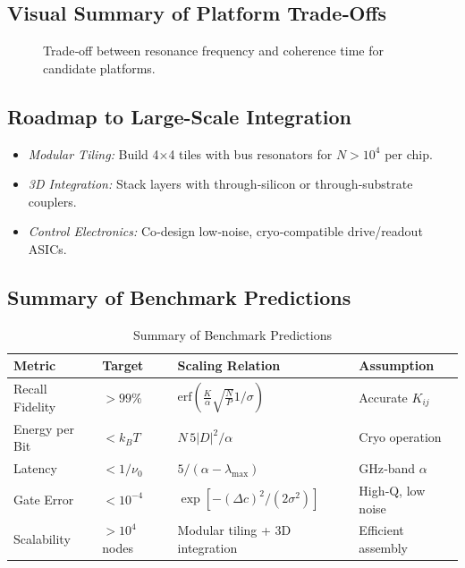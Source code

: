 \subsection{Visual Summary of Platform Trade‐Offs}
\begin{figure}[ht]
  \centering
  \caption{Trade‐off between resonance frequency and coherence time for candidate platforms.}
  \label{fig:platform_tradeoff}
\end{figure}

\subsection{Roadmap to Large-Scale Integration}
\begin{itemize}
  \item \emph{Modular Tiling:} Build 4×4 tiles with bus resonators for $N>10^4$ per chip.
  \item \emph{3D Integration:} Stack layers with through‐silicon or through‐substrate couplers.
  \item \emph{Control Electronics:} Co‐design low‐noise, cryo‐compatible drive/readout ASICs.
\end{itemize}

\subsection{Summary of Benchmark Predictions}
\begin{table}[ht]
  \centering
  \caption{Summary of Benchmark Predictions}
  \begin{tabular}{@{}llll@{}}
    \toprule
    Metric               & Target        & Scaling Relation                   & Assumption \\
    \midrule
    Recall Fidelity      & $>99\%$       & $\mathrm{erf}(\frac{K}{\alpha}\sqrt{\frac{N}{P}}1/\sigma)$ & Accurate $K_{ij}$ \\
    Energy per Bit       & $<k_BT$       & $N\,5|D|^2/\alpha$                 & Cryo operation \\
    Latency              & $<1/\nu_0$    & $5/(\alpha - \lambda_{\max})$      & GHz‐band $\alpha$ \\
    Gate Error           & $<10^{-4}$    & $\exp[-(\Delta c)^2/(2\sigma^2)]$  & High‐Q, low noise \\
    Scalability          & $>10^4$ nodes & Modular tiling + 3D integration    & Efficient assembly \\
    \bottomrule
  \end{tabular}
\end{table}

